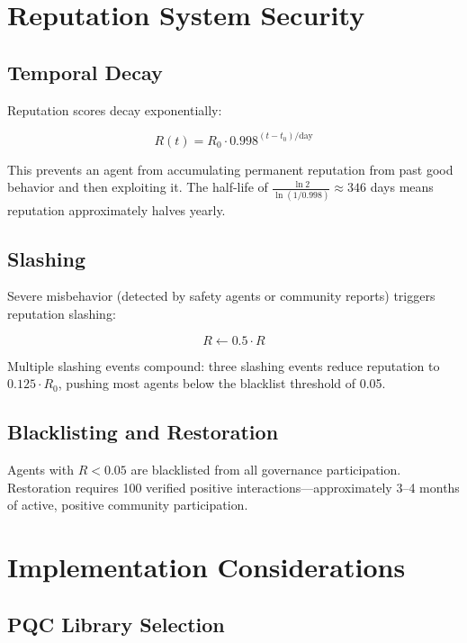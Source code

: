 \documentclass[11pt,twocolumn]{article}
\begin{document}
\section{Reputation System Security}

\subsection{Temporal Decay}

Reputation scores decay exponentially:

\begin{equation}
  R(t) = R_0 \cdot 0.998^{(t - t_0)/\text{day}}
\end{equation}

This prevents an agent from accumulating permanent reputation from past
good behavior and then exploiting it. The half-life of
$\frac{\ln 2}{\ln(1/0.998)} \approx 346$ days means reputation approximately
halves yearly.

\subsection{Slashing}

Severe misbehavior (detected by safety agents or community reports) triggers
reputation slashing:

\begin{equation}
  R \gets 0.5 \cdot R
\end{equation}

Multiple slashing events compound: three slashing events reduce reputation
to $0.125 \cdot R_0$, pushing most agents below the blacklist threshold
of 0.05.

\subsection{Blacklisting and Restoration}

Agents with $R < 0.05$ are blacklisted from all governance participation.
Restoration requires 100 verified positive interactions---approximately
3--4 months of active, positive community participation.

\section{Implementation Considerations}

\subsection{PQC Library Selection}
\end{document}
